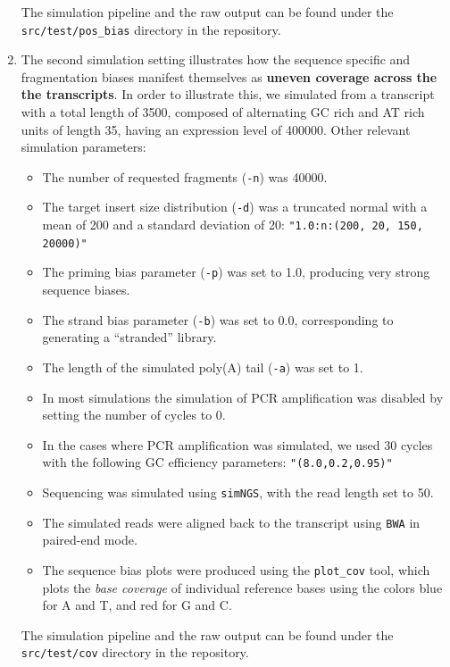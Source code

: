 \begin{enumerate}
{        The simulation pipeline and the raw output can be found under the \texttt{src/test/pos\_bias} directory in the \rlsim repository.
        }
        \item{
        The second simulation setting illustrates how the sequence specific and fragmentation biases manifest themselves as \textbf{uneven coverage across the the transcripts}. In order to illustrate this, we simulated from a transcript with a total length of 3500, composed of alternating GC rich and AT rich units of length 35, having an expression level of 400000. Other relevant simulation parameters:
        \begin{itemize}
            \item The number of requested fragments (\texttt{-n}) was 40000.
            \item{The target insert size distribution (\texttt{-d}) was a truncated normal with a mean of 200 and a standard deviation of 20: \texttt{"1.0:n:(200, 20, 150, 20000)"}}
            \item{The priming bias parameter (\texttt{-p}) was set to 1.0, producing very strong sequence biases.} 
            \item{The strand bias parameter (\texttt{-b}) was set to 0.0, corresponding to generating a ``stranded'' library.}
            \item The length of the simulated poly(A) tail (\texttt{-a}) was set to 1.
            \item{In most simulations the simulation of PCR amplification was disabled by setting the number of cycles to 0.}
            \item{In the cases where PCR amplification was simulated, we used 30 cycles with the following GC efficiency parameters: \texttt{"(8.0,0.2,0.95)"}}
            \item{Sequencing was simulated using \texttt{simNGS}, with the read length set to 50.}
            \item{The simulated reads were aligned back to the transcript using \texttt{BWA} in paired-end mode.}
            \item{The sequence bias plots were produced using the \texttt{plot\_cov} tool, which plots the \emph{base coverage} of individual reference bases using the colors blue for A and T, and red for G and C.}
        \end{itemize}

        The simulation pipeline and the raw output can be found under the \texttt{src/test/cov} directory in the \rlsim repository.
        }
\end{enumerate}

